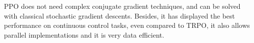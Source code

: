 PPO does not need complex conjugate gradient techniques, and can be solved with classical stochastic gradient descents. Besides, it has displayed the best performance on continuous control tasks, even compared to TRPO, it also allows parallel implementations and it is very data efficient.


